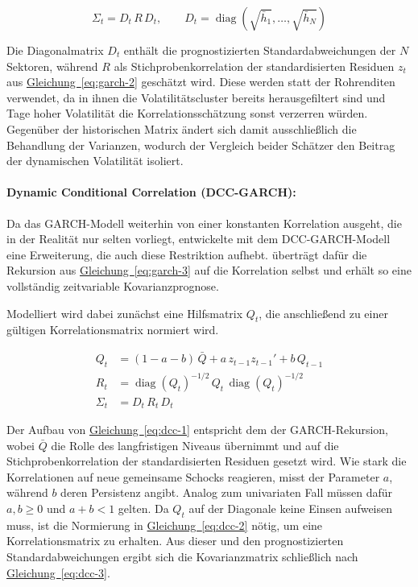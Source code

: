 \documentclass[12pt,a4paper]{article}
\begin{document}
\begin{equation}
	\Sigma_t = D_t\,R\,D_t, \qquad D_t = \operatorname{diag}\left(\sqrt{\bar{h}_{1}}, \dots, \sqrt{\bar{h}_{N}}\right)
	\label{eq:ccc}
\end{equation}

Die Diagonalmatrix $D_t$ enthält die prognostizierten Standardabweichungen der $N$ Sektoren, während $R$ als Stichprobenkorrelation der standardisierten Residuen $z_t$ aus \hyperref[eq:garch-2]{Gleichung~\ref*{eq:garch-2}} geschätzt wird.
Diese werden statt der Rohrenditen verwendet, da in ihnen die Volatilitätscluster bereits herausgefiltert sind und Tage hoher Volatilität die Korrelationsschätzung sonst verzerren würden.
Gegenüber der historischen Matrix ändert sich damit ausschließlich die Behandlung der Varianzen, wodurch der Vergleich beider Schätzer den Beitrag der dynamischen Volatilität isoliert.
\fi

\paragraph{Dynamic Conditional Correlation (DCC-GARCH):}
\iffalse
Da das GARCH-Modell weiterhin von einer konstanten Korrelation ausgeht, die in der Realität nur selten vorliegt, entwickelte \textcite{engle2002} mit dem DCC-GARCH-Modell eine Erweiterung, die auch diese Restriktion aufhebt.
\citeauthor{engle2002} überträgt dafür die Rekursion aus \hyperref[eq:garch-3]{Gleichung~\ref*{eq:garch-3}} auf die Korrelation selbst und erhält so eine vollständig zeitvariable Kovarianzprognose.

Modelliert wird dabei zunächst eine Hilfsmatrix $Q_t$, die anschließend zu einer gültigen Korrelationsmatrix normiert wird.

\begin{align}
	\label{eq:dcc-1}
	Q_t &= (1 - a - b)\,\bar{Q} + a\,z_{t-1}z_{t-1}' + b\,Q_{t-1} \\
	\label{eq:dcc-2}
	R_t &= \operatorname{diag}(Q_t)^{-1/2}\,Q_t\,\operatorname{diag}(Q_t)^{-1/2} \\
	\label{eq:dcc-3}
	\Sigma_t &= D_t\,R_t\,D_t
\end{align}

Der Aufbau von \hyperref[eq:dcc-1]{Gleichung~\ref*{eq:dcc-1}} entspricht dem der GARCH-Rekursion, wobei $\bar{Q}$ die Rolle des langfristigen Niveaus übernimmt und auf die Stichprobenkorrelation der standardisierten Residuen gesetzt wird.
Wie stark die Korrelationen auf neue gemeinsame Schocks reagieren, misst der Parameter $a$, während $b$ deren Persistenz angibt.
Analog zum univariaten Fall müssen dafür $a, b \geq 0$ und $a + b < 1$ gelten.
Da $Q_t$ auf der Diagonale keine Einsen aufweisen muss, ist die Normierung in \hyperref[eq:dcc-2]{Gleichung~\ref*{eq:dcc-2}} nötig, um eine Korrelationsmatrix zu erhalten.
Aus dieser und den prognostizierten Standardabweichungen ergibt sich die Kovarianzmatrix schließlich nach \hyperref[eq:dcc-3]{Gleichung~\ref*{eq:dcc-3}}.
\end{document}
